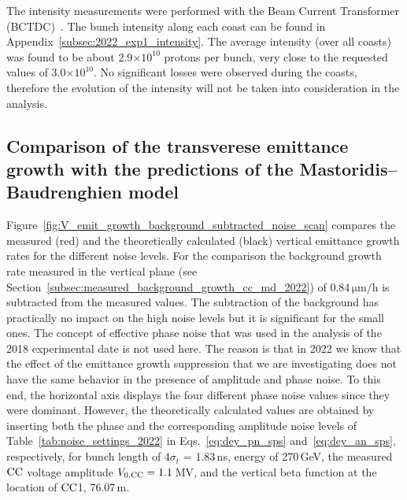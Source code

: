 The intensity measurements were performed with the Beam Current Transformer (BCTDC)~\cite{Jones:1982418, Jakob:624188}. The bunch intensity along each coast can be found in Appendix~\ref{subsec:2022_exp1_intensity}. The average intensity (over all coasts) was found to be about 2.9$\times 10^{10}$ protons per bunch, very close to the requested values of 3.0$\times 10^{10}$. No significant losses were observed during the coasts, therefore the evolution of the intensity will not be taken into consideration in the analysis.

\subsection{Comparison of the transverese emittance growth with the predictions of the Mastoridis--Baudrenghien model}\label{sec:cc_exp1_2022_theory_vs_measurements}

Figure~\ref{fig:V_emit_growth_background_subtracted_noise_scan} compares the measured (red) and the theoretically calculated (black) vertical emittance growth rates for the different noise levels. For the comparison the background growth rate measured in the vertical plane (see Section~\ref{subsec:measured_background_growth_cc_md_2022}) of 0.84\,$\mathrm{\mu m /h}$ is subtracted from the measured values. The subtraction of the background has practically no impact on the high noise levels but it is significant for the small ones. The concept of effective phase noise that was used in the analysis of the 2018 experimental date is not used here. The reason is that in 2022 we know that the effect of the emittance growth suppression that we are investigating does not have the same behavior in the presence of amplitude and phase noise. To this end, the horizontal axis displays the four different phase noise values since they were dominant. However, the theoretically calculated values are obtained by inserting both the phase and the corresponding amplitude noise levels of Table~\ref{tab:noise_settings_2022} in Eqs.~\eqref{eq:dey_pn_sps} and~\eqref{eq:dey_an_sps}, respectively, for bunch length of $4 \sigma_t$ = 1.83\,ns, energy of 270\,GeV, the measured ${\mathrm{CC}}$ voltage amplitude ${V_\mathrm{0, CC}}=1.1$\,MV, and the vertical beta function at the location of ${\mathrm{CC}}$1, 76.07\,m.



